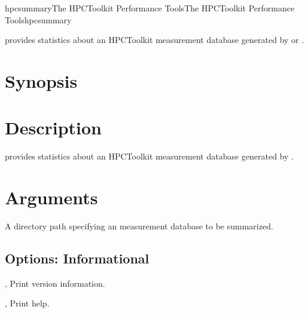 \documentclass[english]{article}
\begin{document}
\begin{Name}{1}{hpcsummary}{The HPCToolkit Performance Tools}{The HPCToolkit Performance Tools}{hpcsummary}

 provides statistics about an HPCToolkit measurement database
generated by  or .

\end{Name}

\section{Synopsis}

  

\section{Description}

 provides statistics about an HPCToolkit measurement database generated by .



\section{Arguments}

\begin{Description}
\item[\Arg{measurement-database}] A directory path specifying
an  measurement database to be summarized.
\end{Description}


\subsection{Options: Informational}

\begin{Description}
\item[\Opt{-V}, \Opt{--version}]
Print version information.

\item[\Opt{-h}, \Opt{--help}]
Print help.
\end{Description}
\end{document}

